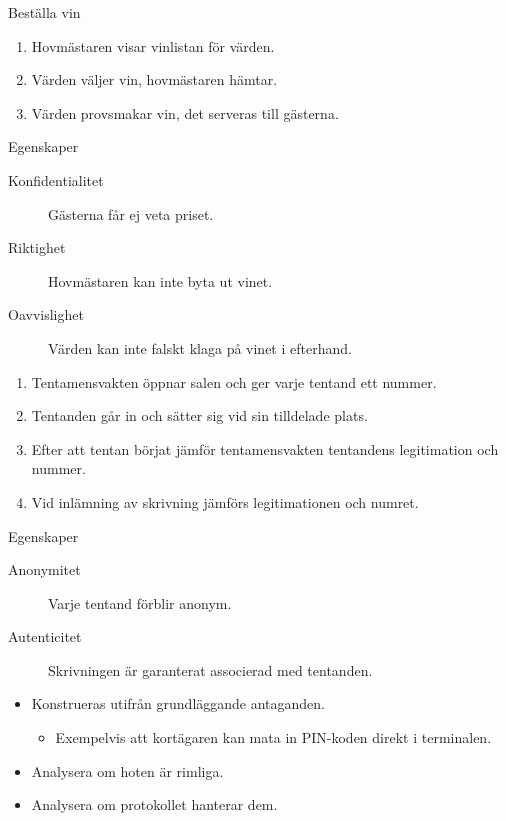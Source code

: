 \documentclass{beamer}
\theoremstyle{definition}
\theoremstyle{remark}
\begin{document}
\begin{frame}
  \begin{example}{Beställa vin}
    \begin{enumerate}
      \item Hovmästaren visar vinlistan för värden.
      \item Värden väljer vin, hovmästaren hämtar.
      \item Värden provsmakar vin, det serveras till gästerna.
    \end{enumerate}
  \end{example}
  \begin{block}{Egenskaper}
    \begin{description}
      \item[Konfidentialitet] Gästerna får ej veta priset.
      \item[Riktighet] Hovmästaren kan inte byta ut vinet.
      \item[Oavvislighet] Värden kan inte falskt klaga på vinet i efterhand.
    \end{description}
  \end{block}
\end{frame}

\begin{frame}
  \begin{example}
    \begin{enumerate}
      \item Tentamensvakten öppnar salen och ger varje tentand ett nummer.
      \item Tentanden går in och sätter sig vid sin tilldelade plats.
      \item Efter att tentan börjat jämför tentamensvakten tentandens 
        legitimation och nummer.
      \item Vid inlämning av skrivning jämförs legitimationen och numret.
    \end{enumerate}
  \end{example}
  \begin{block}{Egenskaper}
    \begin{description}
      \item[Anonymitet] Varje tentand förblir anonym.
      \item[Autenticitet] Skrivningen är garanterat associerad med tentanden.
    \end{description}
  \end{block}
\end{frame}

\begin{frame}
  \begin{itemize}
    \item Konstrueras utifrån grundläggande antaganden.
      \begin{itemize}
        \item Exempelvis att kortägaren kan mata in PIN-koden direkt 
          i terminalen.
    \end{itemize}
    \item Analysera om hoten är rimliga.
    \item Analysera om protokollet hanterar dem.
  \end{itemize}
\end{frame}
\end{document}
